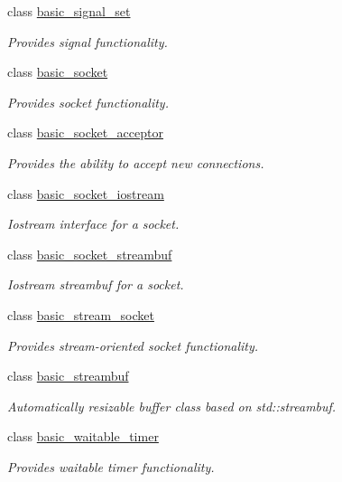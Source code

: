 \begin{DoxyCompactItemize}
class \hyperlink{classasio_1_1basic__signal__set}{basic\+\_\+signal\+\_\+set}
\begin{DoxyCompactList}\small\item\em Provides signal functionality. \end{DoxyCompactList}\item 
class \hyperlink{classasio_1_1basic__socket}{basic\+\_\+socket}
\begin{DoxyCompactList}\small\item\em Provides socket functionality. \end{DoxyCompactList}\item 
class \hyperlink{classasio_1_1basic__socket__acceptor}{basic\+\_\+socket\+\_\+acceptor}
\begin{DoxyCompactList}\small\item\em Provides the ability to accept new connections. \end{DoxyCompactList}\item 
class \hyperlink{classasio_1_1basic__socket__iostream}{basic\+\_\+socket\+\_\+iostream}
\begin{DoxyCompactList}\small\item\em Iostream interface for a socket. \end{DoxyCompactList}\item 
class \hyperlink{classasio_1_1basic__socket__streambuf}{basic\+\_\+socket\+\_\+streambuf}
\begin{DoxyCompactList}\small\item\em Iostream streambuf for a socket. \end{DoxyCompactList}\item 
class \hyperlink{classasio_1_1basic__stream__socket}{basic\+\_\+stream\+\_\+socket}
\begin{DoxyCompactList}\small\item\em Provides stream-\/oriented socket functionality. \end{DoxyCompactList}\item 
class \hyperlink{classasio_1_1basic__streambuf}{basic\+\_\+streambuf}
\begin{DoxyCompactList}\small\item\em Automatically resizable buffer class based on std\+::streambuf. \end{DoxyCompactList}\item 
class \hyperlink{classasio_1_1basic__waitable__timer}{basic\+\_\+waitable\+\_\+timer}
\begin{DoxyCompactList}\small\item\em Provides waitable timer functionality. \end{DoxyCompactList}\item 

\end{DoxyCompactItemize}
